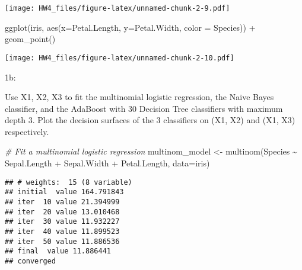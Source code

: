 \documentclass[
]{article}
\newenvironment{Shaded}{\begin{snugshade}}{\end{snugshade}}
\newcommand{\AttributeTok}[1]{\textcolor[rgb]{0.77,0.63,0.00}{#1}}
\newcommand{\CommentTok}[1]{\textcolor[rgb]{0.56,0.35,0.01}{\textit{#1}}}
\newcommand{\FunctionTok}[1]{\textcolor[rgb]{0.00,0.00,0.00}{#1}}
\newcommand{\NormalTok}[1]{#1}
\newcommand{\OtherTok}[1]{\textcolor[rgb]{0.56,0.35,0.01}{#1}}
\newcommand{\SpecialCharTok}[1]{\textcolor[rgb]{0.00,0.00,0.00}{#1}}
\begin{document}
\texttt{[image: HW4\_files/figure-latex/unnamed-chunk-2-9.pdf]}

\begin{Shaded}
\begin{Highlighting}[]
\FunctionTok{ggplot}\NormalTok{(iris, }\FunctionTok{aes}\NormalTok{(}\AttributeTok{x=}\NormalTok{Petal.Length, }\AttributeTok{y=}\NormalTok{Petal.Width, }\AttributeTok{color =}\NormalTok{ Species)) }\SpecialCharTok{+} \FunctionTok{geom\_point}\NormalTok{()}
\end{Highlighting}
\end{Shaded}

\texttt{[image: HW4\_files/figure-latex/unnamed-chunk-2-10.pdf]}

1b:

Use X1, X2, X3 to fit the multinomial logistic regression, the Naive
Bayes classifier, and the AdaBoost with 30 Decision Tree classifiers
with maximum depth 3. Plot the decision surfaces of the 3 classifiers on
(X1, X2) and (X1, X3) respectively.

\begin{Shaded}
\begin{Highlighting}[]
\CommentTok{\# Fit a multinomial logistic regression}
\NormalTok{multinom\_model }\OtherTok{\textless{}{-}} \FunctionTok{multinom}\NormalTok{(Species }\SpecialCharTok{\textasciitilde{}}\NormalTok{ Sepal.Length }\SpecialCharTok{+}\NormalTok{ Sepal.Width }\SpecialCharTok{+}\NormalTok{ Petal.Length, }\AttributeTok{data=}\NormalTok{iris)}
\end{Highlighting}
\end{Shaded}

\begin{verbatim}
## # weights:  15 (8 variable)
## initial  value 164.791843 
## iter  10 value 21.394999
## iter  20 value 13.010468
## iter  30 value 11.932227
## iter  40 value 11.899523
## iter  50 value 11.886536
## final  value 11.886441 
## converged
\end{verbatim}
\end{document}
